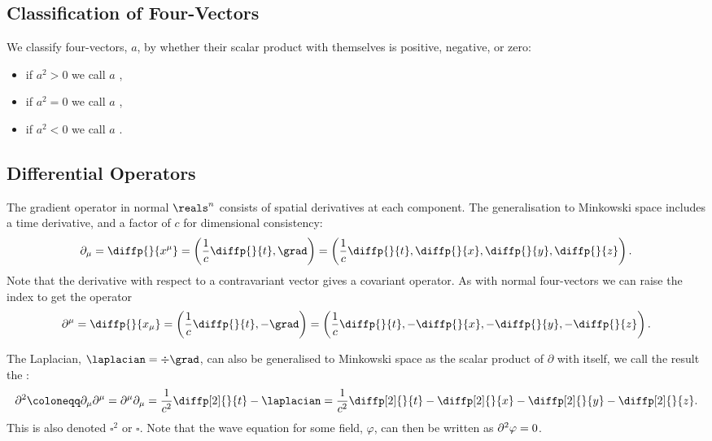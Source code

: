 \subsection{Classification of Four-Vectors}
We classify four-vectors, \(a\), by whether their scalar product with themselves is positive, negative, or zero:
\begin{itemize}
    \item if \(a^2 > 0\) we call \(a\) ,
    \item if \(a^2 = 0\) we call \(a\) ,
    \item if \(a^2 < 0\) we call \(a\) .
\end{itemize}

\subsection{Differential Operators}
The gradient operator in normal \(\reals^n\) consists of spatial derivatives at each component.
The generalisation to Minkowski space includes a time derivative, and a factor of \(c\) for dimensional consistency:
\begin{equation}
    \partial_\mu = \diffp{}{x^\mu} = \left( \frac{1}{c}\diffp{}{t}, \grad \right) = \left( \frac{1}{c}\diffp{}{t}, \diffp{}{x}, \diffp{}{y}, \diffp{}{z} \right).
\end{equation}
Note that the derivative with respect to a contravariant vector gives a covariant operator.
As with normal four-vectors we can raise the index to get the operator
\begin{equation}
    \partial^\mu = \diffp{}{x_\mu} = \left( \frac{1}{c}\diffp{}{t}, -\grad \right) = \left( \frac{1}{c}\diffp{}{t}, -\diffp{}{x}, -\diffp{}{y}, -\diffp{}{z} \right).
\end{equation}

The Laplacian, \(\laplacian = \div \grad\), can also be generalised to Minkowski space as the scalar product of \(\partial\) with itself, we call the result the :
\begin{equation}
    \dalembertian \coloneqq \partial_\mu \partial^\mu = \partial^\mu \partial_\mu = \frac{1}{c^2}\diffp[2]{}{t} - \laplacian = \frac{1}{c^2} \diffp[2]{}{t} - \diffp[2]{}{x} - \diffp[2]{}{y} - \diffp[2]{}{z}.
\end{equation}
This is also denoted \(\square^2\) or \(\square\).
Note that the wave equation for some field, \(\varphi\), can then be written as \(\partial^2\varphi = 0\).


